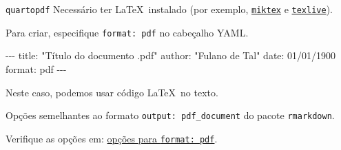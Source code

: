 \documentclass[
  10pt,
  ignorenonframetext,
]{beamer}
\newenvironment{Shaded}{\begin{snugshade}}{\end{snugshade}}
\newcommand{\AttributeTok}[1]{\textcolor[rgb]{0.40,0.45,0.13}{#1}}
\newcommand{\FunctionTok}[1]{\textcolor[rgb]{0.28,0.35,0.67}{#1}}
\newcommand{\KeywordTok}[1]{\textcolor[rgb]{0.00,0.23,0.31}{#1}}
\newcommand{\PreprocessorTok}[1]{\textcolor[rgb]{0.68,0.00,0.00}{#1}}
\newcommand{\StringTok}[1]{\textcolor[rgb]{0.13,0.47,0.30}{#1}}
\begin{document}
\begin{frame}[fragile]{\texttt{quarto}\newline \texttt{pdf}}
\protect\hypertarget{quartopdf}{}
Necessário ter \LaTeX~instalado (por exemplo,
\href{https://miktex.org/}{\texttt{miktex}} e
\href{https://tug.org/texlive/}{\texttt{texlive}}).

Para criar, especifique \texttt{format:\ pdf} no cabeçalho YAML.

\begin{Shaded}
\begin{Highlighting}[]
\PreprocessorTok{{-}{-}{-}}
\FunctionTok{title}\KeywordTok{:}\AttributeTok{ }\StringTok{"Título do documento .pdf"}
\FunctionTok{author}\KeywordTok{:}\AttributeTok{ }\StringTok{"Fulano de Tal"}
\FunctionTok{date}\KeywordTok{:}\AttributeTok{ 01/01/1900}
\FunctionTok{format}\KeywordTok{:}\AttributeTok{ pdf}
\PreprocessorTok{{-}{-}{-}}
\end{Highlighting}
\end{Shaded}

\colorbox{cabecalho}{\textcolor{titulo}{Neste caso, podemos usar código \LaTeX\ no texto.}}

Opções semelhantes ao formato \texttt{output:\ pdf\_document} do pacote
\texttt{rmarkdown}.

Verifique as opções em:
\href{https://quarto.org/docs/reference/formats/pdf.html}{opções para
\texttt{format:\ pdf}}.
\end{frame}
\end{document}
